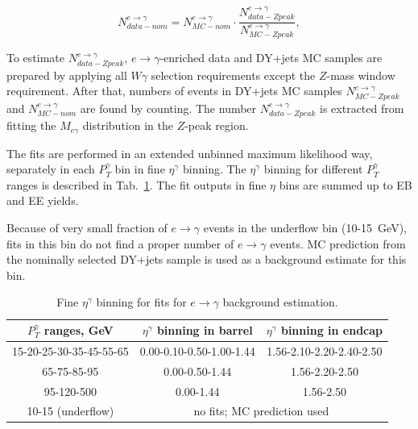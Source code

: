 \begin{equation}\label{eq:Scale_etog}
N_{data-nom}^{e\rightarrow\gamma} = N_{MC-nom}^{e\rightarrow\gamma} \cdot \frac{N_{data-Zpeak}^{e\rightarrow\gamma}}{N_{MC-Zpeak}^{e\rightarrow\gamma}}, 
\end{equation}

To estimate $N_{data-Zpeak}^{e\rightarrow\gamma}$, $e\rightarrow\gamma$-enriched data and DY+jets MC samples are prepared by applying all $W\gamma$ selection requirements except the $Z$-mass window requirement. After that, numbers of events in DY+jets MC samples $N_{MC-Zpeak}^{e\rightarrow\gamma}$ and $N_{MC-nom}^{e\rightarrow\gamma}$ are found by counting. The number $N_{data-Zpeak}^{e\rightarrow\gamma}$ is extracted from fitting the $M_{e\gamma}$ distribution in the $Z$-peak region.

The fits are performed in an extended unbinned maximum likelihood way, separately in each $P_T^\gamma$ bin in fine $\eta^\gamma$ binning. The $\eta^\gamma$ binning for different $P_T^\gamma$ ranges is described in Tab.~\ref{tab:fine_eta_binning}. The fit outputs in fine $\eta$ bins are summed up to EB and EE yields. 

Because of very small fraction of $e\rightarrow\gamma$ events in the underflow bin (10-15~GeV), fits in this bin do not find a proper number of $e\rightarrow\gamma$ events. MC prediction from the nominally selected DY+jets sample is used as a background estimate for this bin. 

\begin{table}[h]
  \small
  \begin{center}
    \caption{Fine $\eta^{\gamma}$ binning for fits for $e\rightarrow\gamma$ background estimation.}
    \begin{tabular}{|c|c|c|}
      \hline
      $P_T^{\gamma}$ ranges, GeV & $\eta^{\gamma}$ binning in barrel &$\eta^{\gamma}$ binning in endcap  \\ \hline
      15-20-25-30-35-45-55-65 & 0.00-0.10-0.50-1.00-1.44         & 1.56-2.10-2.20-2.40-2.50  \\ \hline
      65-75-85-95             & 0.00-0.50-1.44                   & 1.56-2.20-2.50  \\ \hline
      95-120-500              & 0.00-1.44                        & 1.56-2.50  \\ \hline
      10-15 (underflow)       & \multicolumn{2}{|c|}{no fits; MC prediction used} \\ \hline
    \end{tabular}
    \label{tab:fine_eta_binning}
  \end{center}
\end{table} 


